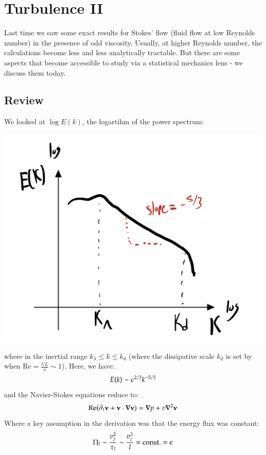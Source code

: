 \section{Turbulence II}

Last time we saw some exact results for Stokes' flow (fluid flow at low Reynolds number) in the presence of odd viscosity. Usually, at higher Reynolds number, the calculations become less and less analytically tractable. But there are some aspects that become accessible to study via a statistical mechanics lens - we discuss them today.

\subsection{Review}
We looked at $\log E(k)$, the logartihm of the power spectrum:

\begin{center}
    \includegraphics[scale=0.35]{Lectures/Images/lec11-spectrum.png}
\end{center}
where in the inertial range $k_\lambda \leq k \leq k_d$ (where the dissipative scale $k_d$ is set by when $\text{Re} = \frac{UL}{\nu} \sim 1$). Here, we have:
\begin{equation}
    E(k) \sim \epsilon^{2/3}k^{-5/3}
\end{equation}
and the Navier-Stokes equations reduce to:
\begin{equation}
    \text{Re}(\p_t \v{v} + \v{v} \cdot \nabla \v{v}) = \nabla p + v \nabla^2\v{v}
\end{equation}
Where a key assumption in the derivation was that the energy flux was constant:
\begin{equation}
    \Pi_l \sim \frac{v_l^2}{\tau_l} \sim \frac{v_l^3}{l} = \text{const.} = \epsilon
\end{equation}


